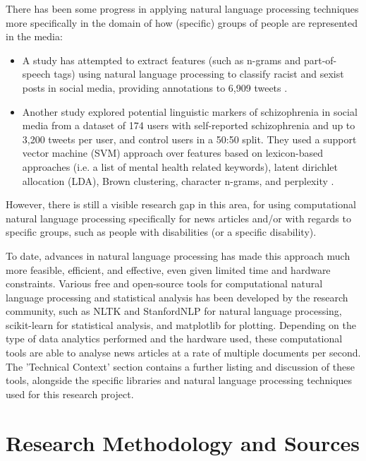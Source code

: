 \documentclass{report}
\begin{document}
There has been some progress in applying natural language processing techniques more specifically in the domain of how (specific) groups of people are represented in the media:
\begin{itemize}
	\item A study has attempted to extract features (such as n-grams and part-of-speech tags) using natural language processing to classify racist and sexist posts in social media, providing annotations to 6,909 tweets \cite{waseem2016you}.
	\item Another study explored potential linguistic markers of schizophrenia in social media from a dataset of 174 users with self-reported schizophrenia and up to 3,200 tweets per user, and control users in a 50:50 split.
		They used a support vector machine (SVM) approach over features based on lexicon-based approaches (i.e. a list of mental health related keywords), latent dirichlet allocation (LDA), Brown clustering, character n-grams, and perplexity \cite{mitchell2015quantifying}.
\end{itemize}
However, there is still a visible research gap in this area, for using computational natural language processing specifically for news articles and/or with regards to specific groups, such as people with disabilities (or a specific disability).

To date, advances in natural language processing has made this approach much more feasible, efficient, and effective, even given limited time and hardware constraints.
Various free and open-source tools for computational natural language processing and statistical analysis has been developed by the research community, such as NLTK \cite{Nltk} and StanfordNLP \cite{StanfordNLP} for natural language processing, scikit-learn \cite{Scikit-learn} for statistical analysis, and matplotlib \cite{Matplotlib} for plotting.
Depending on the type of data analytics performed and the hardware used, these computational tools are able to analyse news articles at a rate of multiple documents per second.
The 'Technical Context' section contains a further listing and discussion of these tools, alongside the specific libraries and natural language processing techniques used for this research project.

\section{Research Methodology and Sources}  %
\end{document}
